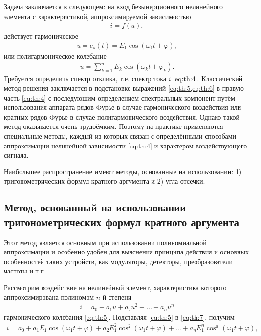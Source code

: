 \documentclass[14pt]{extarticle}
\begin{document}
	Задача заключается в следующем: на вход безынерционного нелинейного элемента с характеристикой, аппроксимируемой зависимостью
	\begin{align} \label{eq:th:4}
		i = f(u),
	\end{align}
	действует гармоническое
	\begin{align} \label{eq:th:5}
		u = e_s(t) = E_1 \cos(\omega_1 t + \varphi),
	\end{align}
	или полигармоническое колебание
	\begin{align} \label{eq:th:6}
		u = \sum^n_{k=1} E_k \cos (\omega_k t + \varphi_k).
	\end{align}
	Требуется определить спектр отклика, т.е. спектр тока $i$ \cref{eq:th:4}. Классический метод решения заключается в подстановке выражений \cref{eq:th:5,eq:th:6} в правую часть \cref{eq:th:4} с последующим определением спектральных компонент путём использования аппарата рядов Фурье в случае гармонического воздействия или кратных рядов Фурье в случае полигармонического воздействия. Однако такой метод оказывается очень трудоёмким. Поэтому на практике применяются специальные методы, каждый из которых связан с определёнными способами аппроксимации нелинейной зависимости \cref{eq:th:4} и характером воздействующего сигнала.
	
	Наибольшее распространение имеют методы, основанные на использовании: 1) тригонометрических формул кратного аргумента и 2) угла отсечки.
	
	\subsection{Метод, основанный на использовании тригонометрических формул кратного аргумента}
	
	Этот метод является основным при использовании полиномиальной аппроксимации и особенно удобен для выяснения принципа действия и основных особенностей таких устройств, как модуляторы, детекторы, преобразователи частоты и т.п.
	
	Рассмотрим воздействие на нелинейный элемент, характеристика которого аппроксимирована полиномом $n$-й степени
	\begin{align} \label{eq:th:7}
		i = a_0 + a_1 u + a_2 u^2 + \dots + a_n u^n
	\end{align} 
	гармонического колебания \cref{eq:th:5}. Подставляя \cref{eq:th:5} в \cref{eq:th:7}, получим
	\begin{align} \label{eq:th:8}
		i = a_0 + a_1 E_1 \cos (\omega_1 t + \varphi) + a_2 E_1^2 \cos^2(\omega_1 t + \varphi) + \dots + a_nE_1^n \cos^n(\omega_1 t + \varphi),
	\end{align}
	
\end{document}
